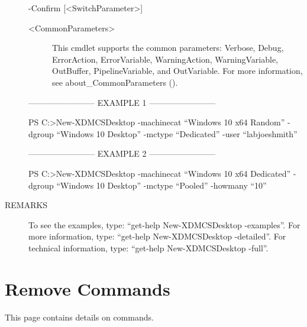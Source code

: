 \documentclass[letterpaper,10pt,english]{sphinxmanual}
\begin{document}
\begin{description}
-Confirm {[}\textless{}SwitchParameter\textgreater{}{]}
\begin{description}
\item[{\textless{}CommonParameters\textgreater{}}] \leavevmode
This cmdlet supports the common parameters: Verbose, Debug,
ErrorAction, ErrorVariable, WarningAction, WarningVariable,
OutBuffer, PipelineVariable, and OutVariable. For more information, see
about\_CommonParameters ().

\end{description}

————————\textendash{} EXAMPLE 1 ————————\textendash{}

PS C:\textgreater{}New-XDMCSDesktop -machinecat “Windows 10 x64 Random” -dgroup “Windows 10 Desktop” -mctype “Dedicated” -user “labjoeshmith”

————————\textendash{} EXAMPLE 2 ————————\textendash{}

PS C:\textgreater{}New-XDMCSDesktop -machinecat “Windows 10 x64 Dedicated” -dgroup “Windows 10 Desktop” -mctype “Pooled” -howmany “10”

\item[{REMARKS}] \leavevmode
To see the examples, type: “get-help New-XDMCSDesktop -examples”.
For more information, type: “get-help New-XDMCSDesktop -detailed”.
For technical information, type: “get-help New-XDMCSDesktop -full”.

\end{description}


\chapter{Remove Commands}
\label{\detokenize{cmd_remove:remove-commands}}\label{\detokenize{cmd_remove::doc}}
This page contains details on  commands.
\end{document}
